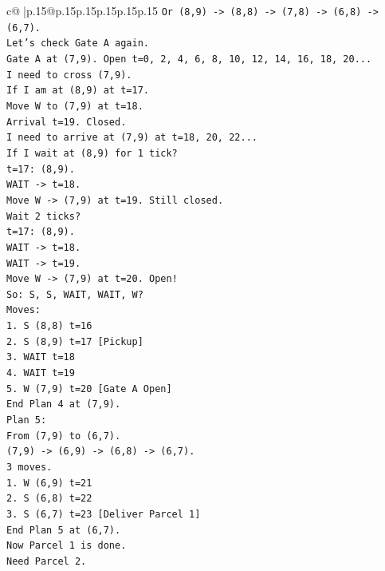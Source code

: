 \documentclass{article}
\begin{document}
{\begin{supertabular}{c@{$\;$}|p{.15\linewidth}@{}p{.15\linewidth}p{.15\linewidth}p{.15\linewidth}p{.15\linewidth}p{.15\linewidth}}
{{{\texttt{Or (8,9) {-}> (8,8) {-}> (7,8) {-}> (6,8) {-}> (6,7).} \\
\texttt{Let's check Gate A again.} \\
\texttt{Gate A at (7,9). Open t=0, 2, 4, 6, 8, 10, 12, 14, 16, 18, 20...} \\
\texttt{I need to cross (7,9).} \\
\texttt{If I am at (8,9) at t=17.} \\
\texttt{Move W to (7,9) at t=18.} \\
\texttt{Arrival t=19. Closed.} \\
\texttt{I need to arrive at (7,9) at t=18, 20, 22...} \\
\texttt{If I wait at (8,9) for 1 tick?} \\
\texttt{t=17: (8,9).} \\
\texttt{WAIT {-}> t=18.} \\
\texttt{Move W {-}> (7,9) at t=19. Still closed.} \\
\texttt{Wait 2 ticks?} \\
\texttt{t=17: (8,9).} \\
\texttt{WAIT {-}> t=18.} \\
\texttt{WAIT {-}> t=19.} \\
\texttt{Move W {-}> (7,9) at t=20. Open!} \\
\texttt{So: S, S, WAIT, WAIT, W?} \\
\texttt{Moves:} \\
\texttt{1. S (8,8) t=16} \\
\texttt{2. S (8,9) t=17 {[}Pickup{]}} \\
\texttt{3. WAIT t=18} \\
\texttt{4. WAIT t=19} \\
\texttt{5. W (7,9) t=20 {[}Gate A Open{]}} \\
\texttt{End Plan 4 at (7,9).} \\
\texttt{Plan 5:} \\
\texttt{From (7,9) to (6,7).} \\
\texttt{(7,9) {-}> (6,9) {-}> (6,8) {-}> (6,7).} \\
\texttt{3 moves.} \\
\texttt{1. W (6,9) t=21} \\
\texttt{2. S (6,8) t=22} \\
\texttt{3. S (6,7) t=23 {[}Deliver Parcel 1{]}} \\
\texttt{End Plan 5 at (6,7).} \\
\texttt{Now Parcel 1 is done.} \\
\texttt{Need Parcel 2.} \\
}}}
\end{supertabular}}
\end{document}
